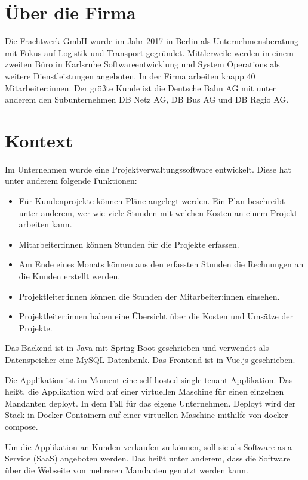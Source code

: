 \section{Über die Firma}
Die Frachtwerk GmbH wurde im Jahr 2017 in Berlin als Unternehmensberatung mit Fokus auf Logistik und Transport gegründet.
Mittlerweile werden in einem zweiten Büro in Karlsruhe Softwareentwicklung und System Operations als weitere Dienstleistungen angeboten.
In der Firma arbeiten knapp 40 Mitarbeiter:innen.
Der größte Kunde ist die Deutsche Bahn AG mit unter anderem den Subunternehmen DB Netz AG, DB Bus AG und DB Regio AG.

\section{Kontext}\label{sec:kontext}

Im Unternehmen wurde eine Projektverwaltungssoftware entwickelt.
Diese hat unter anderem folgende Funktionen:
\begin{itemize}
  \item Für Kundenprojekte können Pläne angelegt werden. Ein Plan beschreibt unter anderem, wer wie viele Stunden mit welchen Kosten an einem Projekt arbeiten kann. 
  \item Mitarbeiter:innen können Stunden für die Projekte erfassen.
  \item Am Ende eines Monats können aus den erfassten Stunden die Rechnungen an die Kunden erstellt werden.
  \item Projektleiter:innen können die Stunden der Mitarbeiter:innen einsehen.
  \item Projektleiter:innen haben eine Übersicht über die Kosten und Umsätze der Projekte.
\end{itemize}

Das Backend ist in Java mit Spring Boot geschrieben und verwendet als
Datenspeicher eine MySQL Datenbank.
Das Frontend ist in Vue.js geschrieben.

Die Applikation ist im Moment eine self-hosted single tenant Applikation.
Das heißt, die Applikation wird auf einer virtuellen Maschine für einen einzelnen Mandanten deployt.
In dem Fall für das eigene Unternehmen.
Deployt wird der Stack in Docker Containern auf einer virtuellen Maschine mithilfe von docker-compose.

Um die Applikation an Kunden verkaufen zu können, soll sie als Software
as a Service (SaaS) angeboten werden.
Das heißt unter anderem, dass die Software über die Webseite von mehreren Mandanten genutzt werden kann.



